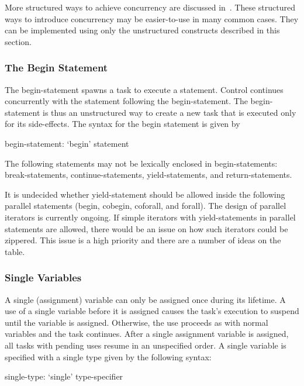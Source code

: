 More structured ways to achieve concurrency are discussed
in~.  These structured ways to
introduce concurrency may be easier-to-use in many common cases.  They
can be implemented using only the unstructured constructs described in
this section.

\subsubsection{The Begin Statement}
\label{Begin}

The begin-statement spawns a task to execute a statement.  Control
continues concurrently with the statement following the
begin-statement. The begin-statement is thus an unstructured way to
create a new task that is executed only for its side-effects. The
syntax for the begin statement is given by
\begin{syntax}
begin-statement:
  `begin' statement
\end{syntax}

The following statements may not be lexically enclosed in
begin-statements: break-statements, continue-statements,
yield-statements, and return-statements.

\begin{openissue}
It is undecided whether yield-statement should be allowed inside the
following parallel statements (begin, cobegin, coforall, and forall).
The design of parallel iterators is currently ongoing.  If simple
iterators with yield-statements in parallel statements are allowed,
there would be an issue on how such iterators could be zippered.  This
issue is a high priority and there are a number of ideas on the table.
\end{openissue}

\subsubsection{Single Variables}
\label{Single_Variables}

A single (assignment) variable can only be assigned once during its
lifetime.  A use of a single variable before it is assigned causes the
task's execution to suspend until the variable is assigned.
Otherwise, the use proceeds as with normal variables and the task
continues.  After a single assignment variable is assigned, all tasks
with pending uses resume in an unspecified order.  A single variable
is specified with a single type given by the following syntax:
\begin{syntax}
single-type:
  `single' type-specifier
\end{syntax}

